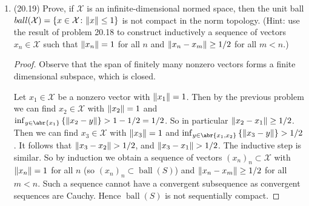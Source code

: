 \documentclass[11pt]{article}
\newcommand{\cbr}[1]{\left\{#1\right\}}
\begin{document}
\begin{enumerate}
\begin{proof}
    \end{proof}
    \item (20.19) Prove, if $\mathcal{X}$ is an infinite-dimensional normed space, then the unit ball $\mathop{ball}(\mathcal{X}) = \cbr{x\in\mathcal{X}\colon \norm{x} \leq 1}$ is not compact in the norm topology. (Hint: use the result of problem 20.18 to construct inductively a sequence of vectors $x_n\in \mathcal{X}$ such that $\norm{x_n} = 1$ for all $n$ and $\norm{x_n-x_m}\geq 1/2$ for all $m<n$.) \begin{proof}
      Observe that the span of finitely many nonzero vectors forms a finite dimensional subspace, which is closed. 
      
      Let $x_1\in \mathcal{X}$ be a nonzero vector with $\norm{x_1} = 1$. Then by the previous problem we can find $x_2\in\mathcal{X}$ with $\norm{x_2} = 1$ and $\inf_{y\in \abr{x_1}}\cbr{\norm{x_2-y}}>1-1/2 =1/2$. So in particular $\norm{x_2-x_1}\geq 1/2$. Then we can find $x_3\in\mathcal{X}$ with $\norm{x_3}=1$ and $\inf_{y\in \abr{x_1,x_2}}\cbr{\norm{x_3-y}}>1/2$. It follows that $\norm{x_3-x_2}>1/2$, and $\norm{x_3-x_1}>1/2$. The inductive step is similar. So by induction we obtain a sequence of vectors $(x_n)_n\subset \mathcal{X}$ with $\norm{x_n} = 1$ for all $n$ (so $(x_n)_n\subset \mathop{ball}(S)$) and $\norm{x_n-x_m}\geq 1/2$ for all $m<n$. Such a sequence cannot have a convergent subsequence as convergent sequences are Cauchy. Hence $\mathop{ball}(S)$ is not sequentially compact.
    \end{proof}
\end{enumerate}
\end{document}

